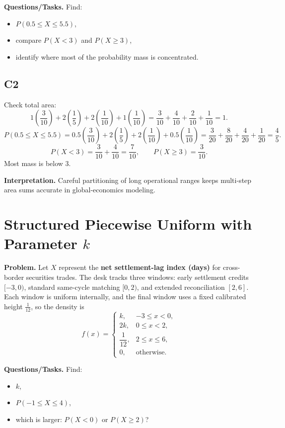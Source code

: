 \textbf{Questions/Tasks.}
Find:
\begin{itemize}
    \item[(a)] $P(0.5\le X\le 5.5)$,
    \item[(b)] compare $P(X<3)$ and $P(X\ge 3)$,
    \item[(c)] identify where most of the probability mass is concentrated.
\end{itemize}

\subsection*{C2}
Check total area:
\[
1\left(\frac{3}{10}\right)+2\left(\frac{1}{5}\right)+2\left(\frac{1}{10}\right)+1\left(\frac{1}{10}\right)
=\frac{3}{10}+\frac{4}{10}+\frac{2}{10}+\frac{1}{10}=1.
\]
\[
P(0.5\le X\le 5.5)=0.5\left(\frac{3}{10}\right)+2\left(\frac{1}{5}\right)+2\left(\frac{1}{10}\right)+0.5\left(\frac{1}{10}\right)
=\frac{3}{20}+\frac{8}{20}+\frac{4}{20}+\frac{1}{20}=\frac{4}{5}.
\]
\[
P(X<3)=\frac{3}{10}+\frac{4}{10}=\frac{7}{10},
\qquad
P(X\ge 3)=\frac{3}{10}.
\]
Most mass is below 3.

\textbf{Interpretation.}
Careful partitioning of long operational ranges keeps multi-step area sums accurate in global-economics modeling.

\section{Structured Piecewise Uniform with Parameter $k$}

\textbf{Problem.}
Let $X$ represent the \textbf{net settlement-lag index (days)} for cross-border securities trades. The desk tracks three windows: early settlement credits $[-3,0)$, standard same-cycle matching $[0,2)$, and extended reconciliation $[2,6]$. Each window is uniform internally, and the final window uses a fixed calibrated height $\tfrac{1}{12}$, so the density is
\[
f(x)=
\begin{cases}
k, & -3\le x<0,\\
2k, & 0\le x<2,\\
\dfrac{1}{12}, & 2\le x\le 6,\\
0, & \text{otherwise.}
\end{cases}
\]

\textbf{Questions/Tasks.}
Find:
\begin{itemize}
    \item[(a)] $k$,
    \item[(b)] $P(-1\le X\le 4)$,
    \item[(c)] which is larger: $P(X<0)$ or $P(X\ge 2)$?
\end{itemize}


